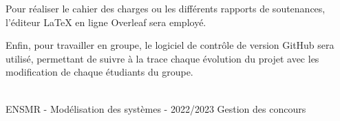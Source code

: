 Pour réaliser le cahier des charges ou les différents rapports de soutenances, l'éditeur \LaTeX{} en ligne Overleaf sera employé.

Enfin, pour travailler en groupe, le logiciel de contrôle de version GitHub sera utilisé, permettant de suivre à la trace chaque évolution du projet avec les modification de chaque étudiants du groupe.

\vfill
\noindent\makebox[\linewidth]{\rule{.8\paperwidth}{.6pt}}\\[0.2cm]
ENSMR - Modélisation des systèmes - 2022/2023 \hfill Gestion des concours
\noindent\makebox[\linewidth]{\rule{.8\paperwidth}{.6pt}}
\newpage